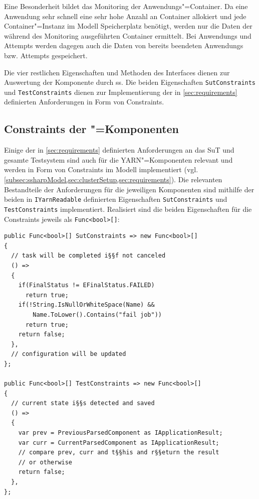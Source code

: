 Eine Besonderheit bildet das Monitoring der Anwendungs"=Container.
Da eine \gls{Anwendung} sehr schnell eine sehr hohe Anzahl an \gls{Container} allokiert und jede Container"=Instanz im Modell Speicherplatz benötigt, werden nur die Daten der während des Monitoring ausgeführten \gls{Container} ermittelt.
Bei \glspl{Anwendung} und \glspl{Attempt} werden dagegen auch die Daten von bereits beendeten \glspl{Anwendung} bzw. \glspl{Attempt} gespeichert.

Die vier restlichen Eigenschaften und Methoden des Interfaces dienen zur Auswertung der Komponente durch \gls{ss}.
Die beiden Eigenschaften \texttt{SutConstraints} und \texttt{TestConstraints} dienen zur Implementierung der in \cref{sec:requirements} definierten Anforderungen in Form von Constraints.

\subsection{Constraints der "=Komponenten}
\label{subsec:yarnComponentConstraints}

Einige der in \cref{sec:requirements} definierten Anforderungen an das \gls{SuT} und gesamte Testsystem sind auch für die \gls{YARN}"=Komponenten relevant und werden in Form von Constraints im Modell implementiert (vgl. \cref{subsec:ssharpModel,sec:clusterSetup,sec:requirements}).
Die relevanten Bestandteile der Anforderungen für die jeweiligen Komponenten sind mithilfe der beiden in \texttt{IYarnReadable} definierten Eigenschaften \texttt{SutConstraints} und \texttt{TestConstraints} implementiert.
Realisiert sind die beiden Eigenschaften für die Constraints jeweils als \texttt{Func<bool>[]}:

\begin{lstlisting}[label=lst:constraintDefinition,style=cs,
caption={[Definition der Constraints in YarnApp]
    Definition der Constraints in \texttt{YarnApp} (gekürzt)}]
public Func<bool>[] SutConstraints => new Func<bool>[]
{
  // task will be completed i§§f not canceled
  () =>
  {
    if(FinalStatus != EFinalStatus.FAILED)
      return true;
    if(!String.IsNullOrWhiteSpace(Name) &&
        Name.ToLower().Contains("fail job"))
      return true;
    return false;
  },
  // configuration will be updated
};

public Func<bool>[] TestConstraints => new Func<bool>[]
{
  // current state i§§s detected and saved
  () =>
  {
    var prev = PreviousParsedComponent as IApplicationResult;
    var curr = CurrentParsedComponent as IApplicationResult;
    // compare prev, curr and t§§his and r§§eturn the result
    // or otherwise
    return false;
  },
};
\end{lstlisting}

